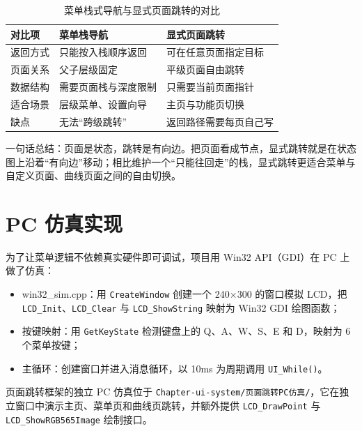 \begin{table}[htbp]
\centering \caption{菜单栈式导航与显式页面跳转的对比} \label{tab:nav-stack-vs-explicit}
    \begin{tabular}{lll}
        \toprule
        对比项 & 菜单栈导航 & 显式页面跳转 \\
        \midrule
        返回方式 & 只能按入栈顺序返回 & 可在任意页面指定目标 \\
        页面关系 & 父子层级固定 & 平级页面自由跳转 \\
        数据结构 & 需要页面栈与深度限制 & 只需要当前页面指针 \\
        适合场景 & 层级菜单、设置向导 & 主页与功能页切换 \\
        缺点 & 无法“跨级跳转” & 返回路径需要每页自己写 \\
        \bottomrule
    \end{tabular}
\end{table}

一句话总结：页面是状态，跳转是有向边。把页面看成节点，显式跳转就是在状态图上沿着“有向边”移动；相比维护一个“只能往回走”的栈，显式跳转更适合菜单与自定义页面、曲线页面之间的自由切换。

\section{PC 仿真实现}

为了让菜单逻辑不依赖真实硬件即可调试，项目用 Win32 API（GDI）在 PC 上做了仿真：

\begin{itemize}
\item win32\_sim.cpp：用 \texttt{CreateWindow} 创建一个 240$\times$300 的窗口模拟 LCD，把 \texttt{LCD\_Init}、\texttt{LCD\_Clear} 与 \texttt{LCD\_ShowString} 映射为 Win32 GDI 绘图函数；
\item 按键映射：用 \texttt{GetKeyState} 检测键盘上的 Q、A、W、S、E 和 D，映射为 6 个菜单按键；
\item 主循环：创建窗口并进入消息循环，以 10ms 为周期调用 \texttt{UI\_While()}。
\end{itemize}

页面跳转框架的独立 PC 仿真位于 \texttt{Chapter-ui-system/页面跳转PC仿真/}，它在独立窗口中演示主页、菜单页和曲线页跳转，并额外提供 \texttt{LCD\_DrawPoint} 与 \texttt{LCD\_ShowRGB565Image} 绘制接口。

